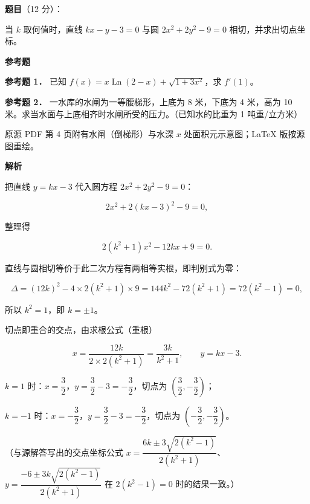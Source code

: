 \begin{answer}

\textbf{题目}（12 分）：

当 $k$ 取何值时，直线 $kx-y-3=0$ 与圆 $2x^2+2y^2-9=0$ 相切，并求出切点坐标。

\begin{gktip}
\textbf{参考题}
\end{gktip}

\textbf{参考题 1．} 已知 $f(x)=x\operatorname{Ln}(2-x)+\sqrt{1+3x^2}$，求 $f'(1)$。

\textbf{参考题 2．} 一水库的水闸为一等腰梯形，上底为 8 米，下底为 4 米，高为 10 米。求当水面与上底相齐时水闸所受的压力。（已知水的比重为 1 吨重/立方米）

\begin{gktip}
原源 PDF 第 4 页附有水闸（倒梯形）与水深 $x$ 处面积元示意图；LaTeX 版按源图重绘。
\end{gktip}
\nopagebreak[4]
\begin{center}\end{center}
\nopagebreak[4]
\textbf{解析}

把直线 $y=kx-3$ 代入圆方程 $2x^2+2y^2-9=0$：

\nopagebreak[4]
\[
2x^2+2(kx-3)^2-9=0,
\]

整理得

\nopagebreak[4]
\[
2(k^2+1)x^2-12kx+9=0.
\]

直线与圆相切等价于此二次方程有两相等实根，即判别式为零：

\nopagebreak[4]
\[
\Delta=(12k)^2-4\times2(k^2+1)\times9
=144k^2-72(k^2+1)
=72(k^2-1)=0,
\]

所以 $k^2=1$，即 $k=\pm1$。

切点即重合的交点，由求根公式（重根）

\nopagebreak[4]
\[
x=\frac{12k}{2\times2(k^2+1)}=\frac{3k}{k^2+1},
\qquad
y=kx-3.
\]

$k=1$ 时：$x=\dfrac32$，$y=\dfrac32-3=-\dfrac32$，切点为 $\left(\dfrac32,-\dfrac32\right)$；

$k=-1$ 时：$x=-\dfrac32$，$y=\dfrac32-3=-\dfrac32$，切点为 $\left(-\dfrac32,-\dfrac32\right)$。

（与源解答写出的交点坐标公式 $x=\dfrac{6k\pm3\sqrt{2(k^2-1)}}{2(k^2+1)}$、$y=\dfrac{-6\pm3k\sqrt{2(k^2-1)}}{2(k^2+1)}$ 在 $2(k^2-1)=0$ 时的结果一致。）


\end{answer}
